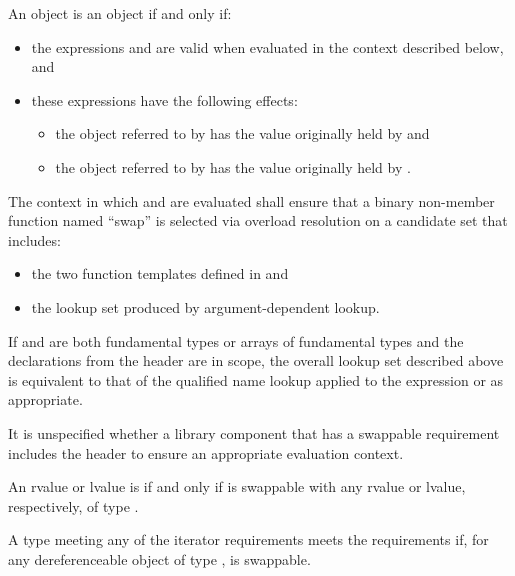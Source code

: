 \pnum
An object  is  an object  if and only if:
\begin{itemize}
\item the expressions  and  are valid when
evaluated in the context described below, and

\item these expressions have the following effects:

\begin{itemize}
\item the object referred to by  has the value originally held by  and
\item the object referred to by  has the value originally held by .
\end{itemize}
\end{itemize}

\pnum
The context in which  and  are evaluated shall
ensure that a binary non-member function named ``swap'' is selected via overload
resolution on a candidate set that includes:
\begin{itemize}
\item the two  function templates defined in
 and

\item the lookup set produced by argument-dependent lookup.
\end{itemize}
\begin{note}
If  and  are both fundamental types or arrays of
fundamental types and the declarations from the header  are in
scope, the overall lookup set described above is equivalent to that of the
qualified name lookup applied to the expression  or
 as appropriate.
\end{note}
\begin{note}
It is unspecified whether a library component that has a swappable
requirement includes the header  to ensure an appropriate
evaluation context.
\end{note}

\pnum
An rvalue or lvalue  is  if and only if  is
swappable with any rvalue or lvalue, respectively, of type .

\pnum
A type  meeting any of the iterator requirements
meets the  requirements if,
for any dereferenceable object
 of type ,
 is swappable.

